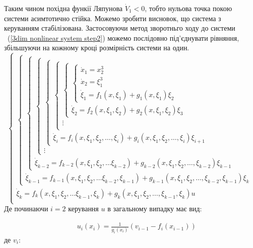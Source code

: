 \documentclass{article}
\begin{document}
Таким чином похідна функії Ляпунова $ \dot V_1 <0$, тобто нульова точка покою системи асимтотично 
стійка. Можемо зробити висновок, що система з керуванням стабілізована.
Застосовуючи метод зворотньго ходу до системи ~(\ref{3dim nonlinear system step2}) можемо послідовно під'єднувати
рівняння, збільшуючи на кожному кроці розмірність системи на один. 
\begin{equation}
{\begin{cases}
{\begin{cases}
{\begin{cases}
{\begin{cases}
{\begin{cases}
{\begin{cases}
{\begin{cases}
{\begin{cases}
\dot x_1 = x_2^3 \\
\dot x_2 = \xi_1^3\\
{\dot  {\xi}}_{1}=f_{1}(x,\xi_{1})+g_{1}(x,\xi_{1})\xi_{2}\end{cases}}\\
{\dot  {\xi}}_{2}=f_{2}(x,\xi_{1},\xi_{2})+g_{2}(x,\xi_{1},\xi_{2})\xi_{3}\end{cases}}\\\vdots \\\end{cases}}\\
{\dot  {\xi}}_{i}=f_{i}(x,\xi_{1},\xi_{2},\ldots ,\xi_{i})+g_{i}(x,\xi_{1},\xi_{2},\ldots ,\xi_{i})\xi_{{i+1}}\end{cases}}\\\vdots \end{cases}}\\
{\dot  {\xi}}_{{k-2}}=f_{{k-2}}(x,\xi_{1},\xi_{2},\ldots \xi_{{k-2}})+g_{{k-2}}(x,\xi_{1},\xi_{2},\ldots ,\xi_{{k-2}})\xi_{{k-1}}\end{cases}}\\
{\dot  {\xi}}_{{k-1}}=f_{{k-1}}(x,\xi_{1},\xi_{2},\ldots \xi_{{k-2}},\xi_{{k-1}})+g_{{k-1}}(x,\xi_{1},\xi_{2},\ldots ,\xi_{{k-2}},\xi_{{k-1}})\xi_{k}\end{cases}}\\
{\dot  {\xi}}_{k}=f_{k}(x,\xi_{1},\xi_{2},\ldots \xi_{{k-1}},\xi_{k})+g_{k}(x,\xi_{1},\xi_{2},\ldots ,\xi_{{k-1}},\xi_{k})u\\\end{cases}}
\end{equation}
Де починаючи $i=2$ керування $u$ в загальному випадку має вид:

\begin{eqnarray}
    &&u_{i}(x_{i})={\frac  {1}{g_{i}(x_{i})}}(v_{i-1}-f_{i}(x_{i-1}))
\end{eqnarray}
де $v_i$:
\end{document}
